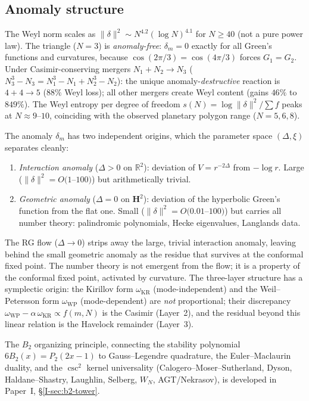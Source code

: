 \subsection{Anomaly structure}

The Weyl norm scales as
$\|\delta\|^2 \sim N^{4.2}(\log N)^{4.1}$ for $N \ge 40$
(not a pure power law).
The triangle ($N = 3$) is \emph{anomaly-free}:
$\delta_m = 0$ exactly for all Green's functions and curvatures,
because $\cos(2\pi/3) = \cos(4\pi/3)$ forces $G_1 = G_2$.
Under Casimir-conserving mergers $N_1 + N_2 \to N_3$
($N_3^3 {-} N_3 = N_1^3 {-} N_1 + N_2^3 {-} N_2$):
the unique anomaly-\emph{destructive} reaction is
$4{+}4 \to 5$ ($88\%$ Weyl loss); all other mergers create
Weyl content (gains $46\%$ to $849\%$).
The Weyl entropy per degree of freedom $s(N) = \log\|\delta\|^2/\sum f$
peaks at $N \approx 9$--$10$, coinciding with the observed
planetary polygon range ($N = 5, 6, 8$).

The anomaly $\delta_m$ has two independent origins, which the
parameter space $(\Delta, \xi)$ separates cleanly:
\begin{enumerate}
\item \emph{Interaction anomaly} ($\Delta > 0$ on $\mathbb{R}^2$):
  deviation of $V = r^{-2\Delta}$ from $-\log r$.
  Large ($\|\delta\|^2 = O(1$--$100)$) but arithmetically trivial.
\item \emph{Geometric anomaly} ($\Delta = 0$ on $\mathbf{H}^2$):
  deviation of the hyperbolic Green's function from the flat one.
  Small ($\|\delta\|^2 = O(0.01$--$100)$) but carries all
  number theory: palindromic polynomials, Hecke eigenvalues,
  Langlands data.
\end{enumerate}
The RG flow ($\Delta \to 0$) strips away the large, trivial
interaction anomaly, leaving behind the small geometric anomaly
as the residue that survives at the conformal fixed point.
The number theory is not emergent from the flow; it is a property
of the conformal fixed point, activated by curvature.
The three-layer structure has a symplectic origin: the Kirillov
form $\omega_{\mathrm{KR}}$ (mode-independent) and the Weil--Petersson
form $\omega_{\mathrm{WP}}$ (mode-dependent) are \emph{not} proportional;
their discrepancy $\omega_{\mathrm{WP}} - \alpha\,\omega_{\mathrm{KR}}
\propto f(m,N)$ is the Casimir (Layer~2), and the residual beyond
this linear relation is the Havelock remainder (Layer~3).

The $B_2$ organizing principle, connecting the stability polynomial
$6B_2(x) = P_2(2x{-}1)$ to Gauss--Legendre quadrature, the
Euler--Maclaurin duality, and the $\csc^2$ kernel universality
(Calogero--Moser--Sutherland, Dyson, Haldane--Shastry, Laughlin,
Selberg, $W_N$, AGT/Nekrasov), is developed in Paper~I, \S\ref*{I-sec:b2-tower}.

